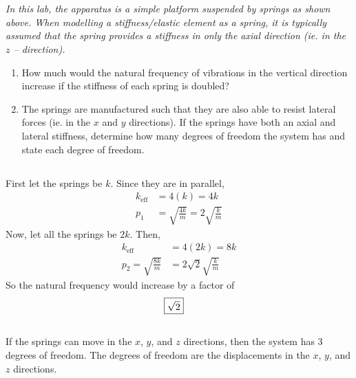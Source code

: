\section{}
\textit{In this lab, the apparatus is a simple platform suspended by springs as shown above. When modelling a stiffness/elastic element as a spring, it is typically assumed that the spring provides a stiffness in only the axial direction (ie. in the $z$ – direction).}

\begin{enumerate}[label=(\alph*)]
    \item How much would the natural frequency of vibrations in the vertical direction increase if the stiffness of each spring is doubled?
    \item The springs are manufactured such that they are also able to resist lateral forces (ie. in the $x$ and $y$ directions). If the springs have both an axial and lateral stiffness, determine how many degrees of freedom the system has and state each degree of freedom.
\end{enumerate}
\subsection{}
First let the springs be $k$. Since they are in parallel,
\begin{align*}
    k_{\text{eff}} &= 4(k) = 4k \\
    p_1 &= \sqrt{\frac{4k}{m}} = 2\sqrt{\frac{k}{m}}
\end{align*}
Now, let all the springs be $2k$. Then,
\begin{align*}
    k_{\text{eff}} &= 4(2k) = 8k \\
    p_2 = \sqrt{\frac{8k}{m}} &= 2\sqrt{2}\sqrt{\frac{k}{m}}
\end{align*}
So the natural frequency would increase by a factor of 
\begin{align*}
    \Aboxed{\sqrt{2}}
\end{align*}

\subsection{}
If the springs can move in the $x$, $y$, and $z$ directions, then the system has 3 degrees of freedom. The degrees of freedom are the displacements in the $x$, $y$, and $z$ directions.

